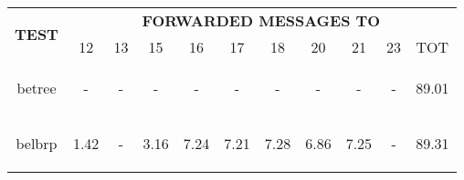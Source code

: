 \documentclass{article}
\begin{document}
		\begin{table}[H]
			\begin{center}
			    \begin{tabular}{|c|c|c|c|c|c|c|c|c|c|c|}
				    \hline
				    \multirow{2}{*}{\textbf{TEST}} & \multicolumn{10}{c|}{\textbf{FORWARDED MESSAGES TO}} \\ \cline{2-11}
					& 12 & 13 & 15 & 16 & 17 &  18 & 20 & 21 & 23 & TOT \\ \hline
				    betree & \begin{footnotesize}-\end{footnotesize} & \begin{footnotesize}-\end{footnotesize} & \begin{footnotesize}-\end{footnotesize} & \begin{footnotesize}-\end{footnotesize} & \begin{footnotesize}-\end{footnotesize} & \begin{footnotesize}-\end{footnotesize} & \begin{footnotesize}-\end{footnotesize} & \begin{footnotesize}-\end{footnotesize} & \begin{footnotesize}-\end{footnotesize} & \begin{footnotesize}89.01\end{footnotesize} \\ \hline
				    belbrp & \begin{footnotesize}1.42\end{footnotesize} & \begin{footnotesize}-\end{footnotesize} & \begin{footnotesize}3.16\end{footnotesize} & \begin{footnotesize}7.24\end{footnotesize} & \begin{footnotesize}7.21\end{footnotesize} & \begin{footnotesize}7.28\end{footnotesize} & \begin{footnotesize}6.86\end{footnotesize} & \begin{footnotesize}7.25\end{footnotesize} & \begin{footnotesize}-\end{footnotesize} & \begin{footnotesize}89.31\end{footnotesize} \\ \hline

\end{tabular}
\end{center}
\end{table}
\end{document}
